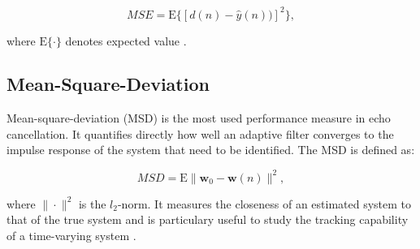 \vspace{-1.5cm}
\begin{equation}
MSE=\mathrm{E}\{[d(n)-\hat{y}(n))]^2\},\label{eq3a}
\end{equation}

\vspace{-0.6cm}
\noindent where $\mathrm{E}\{\cdot\}$ denotes expected value \cite{Mathews}.

\vspace{-0.3cm}
\subsection{Mean-Square-Deviation} \label{sec:1.6.3}
\vspace{-0.5cm}
\noindent Mean-square-deviation (MSD) is the most used performance measure in echo cancellation. It quantifies directly how well an adaptive filter converges to the impulse response of the system that need to be identified. The MSD is defined as:

\vspace{-1.5cm}
\begin{equation}
MSD=\mathrm{E}\|\textbf{w}_0-\textbf{w}(n)\|^{2}, \label{eq4a}
\end{equation}

\vspace{-0.6cm}
\noindent where $\|\cdot\|^2$ is the $l_2$-norm. It measures the closeness of an estimated system to that of the true system and is particulary useful to study the tracking capability of a time-varying system \cite{Dohono}.














































